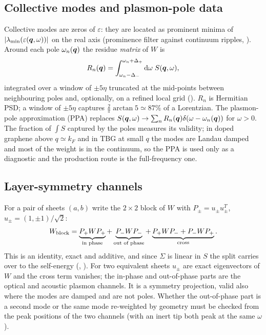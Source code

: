 \subsection{Collective modes and plasmon-pole data}
\label{sec:ppa}

Collective modes are zeros of $\varepsilon$: they are located as prominent minima of $|\lambda_{\min}(\varepsilon(\bm q,\omega))|$
on the real axis (prominence filter against continuum ripples, ). Around each
pole $\omega_n(\bm q)$ the residue \emph{matrix} of $W$ is
\begin{equation}
R_n(\bm q)=\int_{\omega_n-\Delta_-}^{\omega_n+\Delta_+}\mathrm d\omega\;S(\bm q,\omega),
\label{eq:residue}
\end{equation}
integrated over a window of $\pm5\eta$ truncated at the mid-points between neighbouring poles and, optionally,
on a refined local grid (). $R_n$ is Hermitian
PSD; a window of $\pm5\eta$ captures $\frac{2}{\pi}\arctan5\simeq87\%$ of a Lorentzian. The plasmon-pole
approximation (PPA) replaces $S(\bm q,\omega)\to\sum_nR_n(\bm q)\delta(\omega-\omega_n(\bm q))$ for $\omega>0$. The
fraction of $\int S$ captured by the poles measures its validity; in doped graphene above $q\simeq k_F$ and
in TBG at small $q$ the modes are Landau damped and most of the weight is in the continuum, so the PPA is
used only as a diagnostic and the production route is the full-frequency one.

\subsection{Layer-symmetry channels}
\label{sec:channels}

For a pair of sheets $(a,b)$ write the $2\times2$ block of $W$ with $P_\pm=u_\pm u_\pm^T$,
$u_\pm=(1,\pm1)/\sqrt2$:
\begin{equation}
W_{\rm block}=\underbrace{P_+WP_+}_{\text{in phase}}+\underbrace{P_-WP_-}_{\text{out of phase}}
+\underbrace{P_+WP_-+P_-WP_+}_{\text{cross}} .
\label{eq:channels}
\end{equation}
This is an identity, exact and additive, and since $\Sigma$ is linear in $S$ the split carries over to the
self-energy (, ).
For two equivalent sheets $u_\pm$ are exact eigenvectors of $W$ and the cross term vanishes; the in-phase and
out-of-phase parts are the optical and acoustic plasmon channels. It is a symmetry projection, valid also where
the modes are damped and are not poles. Whether the out-of-phase part is a second mode or the same mode
re-weighted by geometry must be checked from the peak positions of the two channels (with an inert tip both
peak at the same $\omega$).
